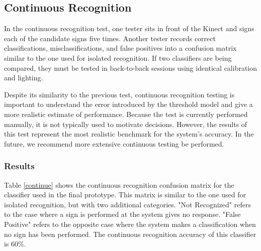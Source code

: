 \documentclass[12pt]{article}
\begin{document}
\subsection{Continuous Recognition}
In the continuous recognition test, one tester sits in front of the Kinect and signs each of the candidate signs five times. Another tester records correct classifications, misclassifications, and false positives into a confusion matrix similar to the one used for isolated recognition. If two classifiers are being compared, they must be tested in back-to-back sessions using identical calibration and lighting.

Despite its similarity to the previous test, continuous recognition testing is important to understand the error introduced by the threshold model and give a more realistic estimate of performance. Because the test is currently performed manually, it is not typically used to motivate decisions. However, the results of this test represent the most realistic benchmark for the system’s accuracy. In the future, we recommend more extensive continuous testing be performed.

\subsubsection{Results}
Table \ref{continue} shows the continuous recognition confusion matrix for the classifier used in the final prototype. This matrix is similar to the one used for isolated recognition, but with two additional categories. "Not Recognized" refers to the case where a sign is performed at the system gives no response. "False Positive" refers to the opposite case where the system makes a classification when no sign has been performed. The continuous recognition accuracy of this classifier is 60\%.  
\end{document}
